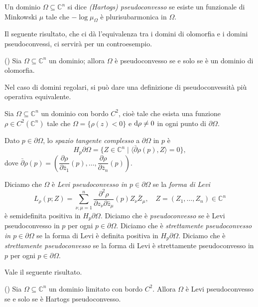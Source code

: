\begin{defn}
    Un dominio $\Omega \subseteq \mathbb{C}^n$ si dice \textit{(Hartogs) pseudoconvesso} se esiste un funzionale di Minkowski $\mu$ tale che $-\log\mu_{\Omega}$ è plurisubarmonica in $\Omega$.
\end{defn}

 Il seguente risultato, che ci dà l'equivalenza tra i domini di olomorfia e i domini pseudoconvessi, ci servirà per un controesempio.

 \begin{thm}
    (\cite[Theorem 5.1.3, equivalence between (1) and (3)]{Kr}) Sia $\Omega\subseteq\mathbb{C}^n$ un dominio; allora $\Omega$ è pseudoconvesso se e solo se è un dominio di olomorfia.
 \end{thm}

Nel caso di domini regolari, si può dare una definizione di pseudoconvessità più operativa equivalente.

\begin{defn}
    Sia $\Omega \subseteq \mathbb{C}^n$ un dominio con bordo $C^2$, cioè tale che esista una funzione $\rho \in C^2(\mathbb{C}^n)$ tale che $\Omega=\{\rho(z)<0\}$ e $\mathop{}\!\mathrm{d}\rho\not=0$ in ogni punto di $\partial\Omega$.
    
    Dato $p \in \partial\Omega$, lo \textit{spazio tangente complesso} a $\partial\Omega$ in $p$ è
    $$H_p\partial\Omega=\{Z \in \mathbb{C}^n \mid \langle \bar{\partial}\rho(p),Z\rangle=0\},$$
    dove $\bar{\partial}\rho(p)=\left(\dfrac{\partial\rho}{\partial\bar{z}_1}(p),\dots,\dfrac{\partial\rho}{\partial\bar{z}_n}(p)\right)$.

    Diciamo che $\Omega$ è \textit{Levi pseudoconvesso in $p\in\partial\Omega$} se la \textit{forma di Levi}
    $$L_{\rho}(p;Z)=\sum_{\nu,\mu=1}^n \frac{\partial^2\rho}{\partial z_\nu\partial\bar{z}_\mu}(p)Z_\nu\bar{Z}_\mu, \quad Z=(Z_1,\dots,Z_n) \in \mathbb{C}^n$$
      è semidefinita positiva in $H_p\partial\Omega$. Diciamo che è \textit{pseudoconvesso} se è Levi pseudoconvesso in $p$ per ogni $p \in \partial\Omega$. Diciamo che è \textit{strettamente pseudoconvesso in $p\in\partial\Omega$} se la forma di Levi è definita positiva in $H_p\partial\Omega$. Diciamo che è \textit{strettamente pseudoconvesso} se la forma di Levi è strettamente pseudoconvesso in $p$ per ogni $p \in \partial\Omega$.
\end{defn}

Vale il seguente risultato.
\begin{thm}
    (\cite[Theorem 3.3.5]{Kr}) Sia $\Omega \subseteq \mathbb{C}^n$ un dominio limitato con bordo $C^2$. Allora $\Omega$ è Levi pseudoconvesso se e solo se è Hartogs pseudoconvesso.
    \vspace*{-\baselineskip}
\end{thm}


